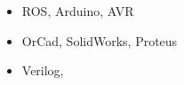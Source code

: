 \EngineeringSkills 

\begin{itemize}
    \item ROS, Arduino,  AVR
    \item OrCad, SolidWorks, Proteus
    \item Verilog, 
\end{itemize}
